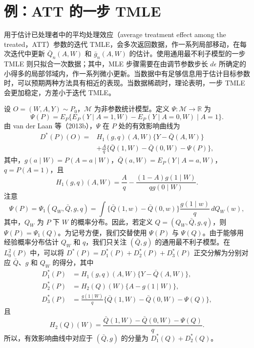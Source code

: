 \section{例：ATT 的一步 TMLE}

用于估计已处理者中的平均处理效应（average treatment effect among the treated，ATT）参数的迭代 TMLE，会多次返回数据，作一系列局部移动，在每次迭代中更新 $\bar Q_n(A,W)$ 和 $\bar g_n(A,W)$ 的估计。使用通用最不利子模型的一步 TMLE 则只拟合一次数据；其中，MLE 步骤需要在由调节参数步长 $d\epsilon$ 所确定的小得多的局部邻域内，作一系列微小更新。当数据中有足够信息用于估计目标参数时，可以预期两种方法具有相近的表现。当数据稀疏时，理论表明，一步 TMLE 会更加稳定，方差小于迭代 TMLE。

设 $O=(W,A,Y)\sim P_0$，$\mathcal M$ 为非参数统计模型。定义 $\Psi:\mathcal M\to\mathbb R$ 为
\[
 \Psi(P)=E_P\{E_P(Y\mid A=1,W)-E_P(Y\mid A=0,W)\mid A=1\}.
\]
由 van der Laan 等（2013b），$\Psi$ 在 $P$ 处的有效影响曲线为
\[
 \begin{aligned}
 D^*(P)(O)={}&H_1(g,q)(A,W)\{Y-\bar Q(A,W)\}\\
 &+\frac{A}{q}\{\bar Q(1,W)-\bar Q(0,W)-\Psi(P)\},
 \end{aligned}
\]
其中，$g(a\mid W)=P(A=a\mid W)$，$\bar Q(a,W)=E_P(Y\mid A=a,W)$，$q=P(A=1)$，且
\[
 H_1(g,q)(A,W)=\frac{A}{q}
 -\frac{(1-A)g(1\mid W)}{qg(0\mid W)}.
\]
注意
\[
 \Psi(P)=\Psi_1(Q_W,\bar Q,g,q)
 =\int\{\bar Q(1,w)-\bar Q(0,w)\}
 \frac{g(1\mid w)}q\,dQ_W(w),
\]
其中，$Q_W$ 为 $P$ 下 $W$ 的概率分布。因此，若定义 $Q=(Q_W,\bar Q,g,q)$，则 $\Psi(P)=\Psi_1(Q)$。为记号方便，我们交替使用 $\Psi(P)$ 与 $\Psi(Q)$。由于能够用经验概率分布估计 $Q_W$ 和 $q$，我们只关注 $(\bar Q,g)$ 的通用最不利子模型。在 $L_0^2(P)$ 中，可以将 $D^*(P)=D_1^*(P)+D_2^*(P)+D_3^*(P)$ 正交分解为分别对应 $\bar Q$、$g$ 和 $Q_W$ 的得分，其中
\[
 \begin{aligned}
 D_1^*(P)&=H_1(g,q)(A,W)\{Y-\bar Q(A,W)\},\\
 D_2^*(P)&=H_2(Q)(W)\{A-g(1\mid W)\},\\
 D_3^*(P)&=\frac{g(1\mid W)}q
 \{\bar Q(1,W)-\bar Q(0,W)-\Psi(Q)\},
 \end{aligned}
\]
且
\[
 H_2(Q)(W)=\frac{\bar Q(1,W)-\bar Q(0,W)-\Psi(Q)}q.
\]
所以，有效影响曲线中对应于 $(\bar Q,g)$ 的分量为 $D_1^*(Q)+D_2^*(Q)$。


